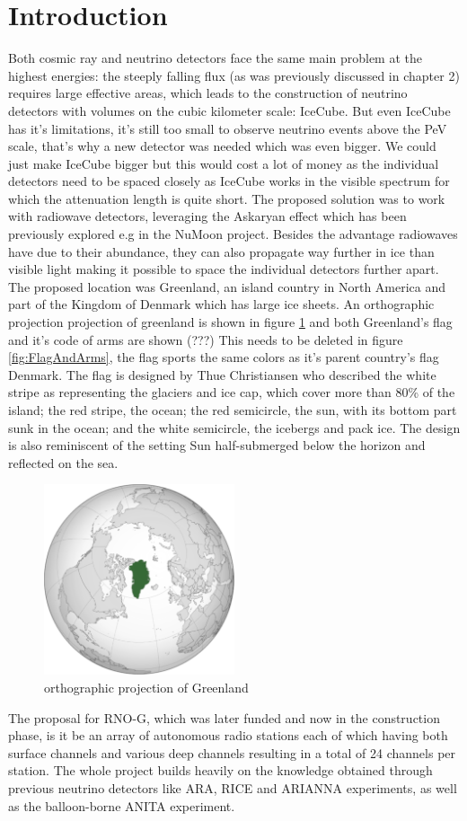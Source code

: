\documentclass[11pt,a4paper,faculty=we,language=en,doctype=report]{cls/ugent-doc}
\begin{document}
\section{Introduction}
Both cosmic ray and neutrino detectors face the same main problem at the
highest energies: the steeply falling flux (as was previously discussed in
chapter 2) requires large effective areas, which leads to the construction of
neutrino detectors with volumes on the cubic kilometer scale: IceCube.  But
even IceCube has it's limitations, it's still too small to observe neutrino
events above the PeV scale, that's why a new detector was needed which was even
bigger.  We could just make IceCube bigger but this would cost a lot of money
as the individual detectors need to be spaced closely as IceCube works in the
visible spectrum for which the attenuation length is quite short. The proposed
solution was to work with radiowave detectors, leveraging the Askaryan effect
which has been previously explored e.g in the NuMoon project.  Besides the
advantage radiowaves have due to their abundance, they can also propagate way
further in ice than visible light making it possible to space the individual
detectors further apart. The proposed location was Greenland, an island country
in North America and part of the Kingdom of Denmark which has large ice sheets.
An orthographic projection projection of greenland is shown in figure
\ref{fig:GreenlandOP} and both Greenland's flag and it's code of arms are shown
(???) This needs to be deleted
in figure \ref{fig:FlagAndArms}, the flag sports the same colors as it's parent
country's flag Denmark. The flag is designed by Thue Christiansen who described
the white stripe as representing the glaciers and ice cap, which cover more
than 80\% of the island; the red stripe, the ocean; the red semicircle, the
sun, with its bottom part sunk in the ocean; and the white semicircle, the
icebergs and pack ice. The design is also reminiscent of the setting Sun
half-submerged below the horizon and reflected on the sea.
\begin{figure}
  \centering
  \includegraphics[width=0.5\textwidth]{figures/GreenlandOP.pdf}
  \caption{orthographic projection of Greenland}
  \label{fig:GreenlandOP}
\end{figure}
\newpage
The proposal for RNO-G, which was later funded and now in the construction
phase, is it be an array of autonomous radio stations each of which having both
surface channels and various deep channels resulting in a total of 24 channels
per station. The whole project builds heavily on the knowledge obtained through
previous neutrino detectors like ARA, RICE and ARIANNA experiments, as well as
the balloon-borne ANITA experiment.
\end{document}
